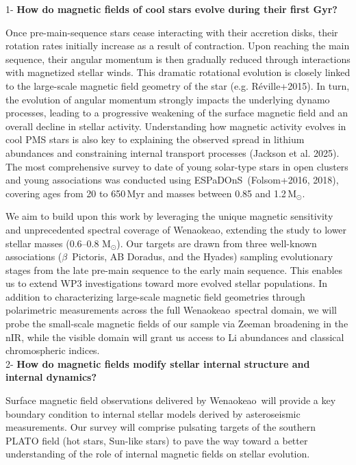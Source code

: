\documentclass[
    traditabstract,
    longauth,
    onecolumn,
]{aa}
\def \MS{M$_{\odot}$}
\def \esp{ESPaDOnS}
\def \wena{Wenaokeao}
\begin{document}
1- {\bf How do magnetic fields of cool stars evolve during their first Gyr?}

Once pre-main-sequence stars cease interacting with their accretion disks, their rotation rates initially increase as a result of contraction. Upon reaching the main sequence, their angular momentum is then gradually reduced through interactions with magnetized stellar winds. This dramatic rotational evolution is closely linked to the large-scale magnetic field geometry of the star (e.g. Réville+2015). In turn, the evolution of angular momentum strongly impacts the underlying dynamo processes, leading to a progressive weakening of the surface magnetic field and an overall decline in stellar activity. Understanding how magnetic activity evolves in cool PMS stars is also key to explaining the observed spread in lithium abundances and constraining internal transport processes (Jackson et al. 2025). The most comprehensive survey to date of young solar-type stars in open clusters and young associations was conducted using \esp\ (Folsom+2016, 2018), covering ages from 20 to 650\,Myr and masses between 0.85 and 1.2\,\MS. 

We aim to build upon this work by leveraging the unique magnetic sensitivity and unprecedented spectral coverage of \wena, extending the study to lower stellar masses (0.6–0.8 \MS). Our targets are drawn from three well-known associations ($\beta$~Pictoris, AB Doradus, and the Hyades) sampling evolutionary stages from the late pre-main sequence to the early main sequence. This enables us to extend WP3 investigations toward more evolved stellar populations. In addition to characterizing large-scale magnetic field geometries through polarimetric measurements across the full \wena\ spectral domain, we will probe the small-scale magnetic fields of our sample via Zeeman broadening in the nIR, while the visible domain will grant us access to Li abundances and classical chromospheric indices.\\

2- {\bf How do magnetic fields modify stellar internal structure and internal dynamics?} 

Surface magnetic field observations delivered by \wena\ will provide a key boundary condition to internal stellar models derived by asteroseismic measurements. Our survey will comprise pulsating targets of the southern PLATO field (hot stars, Sun-like stars) to pave the way toward a better understanding of the role of internal magnetic fields on stellar evolution.
\end{document}
